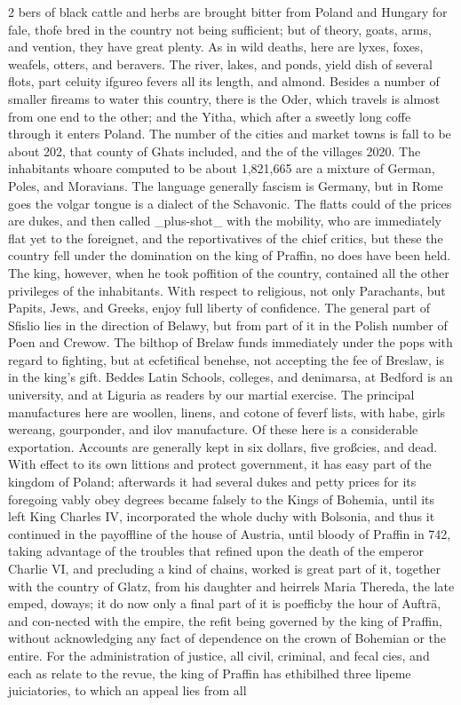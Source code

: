 \documentclass[10pt]{article}
\begin{document}
\begin{multicols}{2}\raggedcolumns
bers of black cattle and herbs are brought bitter from Poland and Hungary for fale, thofe bred in the country not being sufficient; but of theory, goats, arms, and vention, they have great plenty. As in wild deaths, here are lyxes, foxes, weafels, otters, and beravers. The river, lakes, and ponds, yield dish of several flots, part celuity ifgureo fevers all its length, and almond. Besides a number of smaller fireams to water this country, there is the Oder, which travels is almost from one end to the other; and the Yitha, which after a sweetly long coffe through it enters Poland. The number of the cities and market towns is fall to be about 202, that county of Ghats included, and the of the villages 2020. The inhabitants whoare computed to be about 1,821,665 are a mixture of German, Poles, and Moravians. The language generally fascism is Germany, but in Rome goes the volgar tongue is a dialect of the Schavonic. The flatts could of the prices are dukes, and then called \_plus-shot\_ with the mobility, who are immediately flat yet to the foreignet, and the reportivatives of the chief critics, but these the country fell under the domination on the king of Praffin, no does have been held. The king, however, when he took poffition of the country, contained all the other privileges of the inhabitants. With respect to religious, not only Parachants, but Papits, Jews, and Greeks, enjoy full liberty of confidence. The general part of Sfislio lies in the direction of Belawy, but from part of it in the Polish number of Poen and Crewow. The bilthop of Brelaw funds immediately under the pops with regard to fighting, but at ecfetifical benehse, not accepting the fee of Breslaw, is in the king’s gift. Beddes Latin Schools, colleges, and denimarsa, at Bedford is an university, and at Liguria as readers by our martial exercise. The principal manufactures here are woollen, linens, and cotone of feverf lists, with habe, girls wereang, gourponder, and ilov manufacture. Of these here is a considerable exportation. Accounts are generally kept in six dollars, five großcies, and dead. With effect to its own littions and protect government, it has easy part of the kingdom of Poland; afterwards it had several dukes and petty prices for its foregoing vably obey degrees became falsely to the Kings of Bohemia, until its left King Charles IV, incorporated the whole duchy with Bolsonia, and thus it continued in the payoffline of the house of Austria, until bloody of Praffin in 742, taking advantage of the troubles that refined upon the death of the emperor Charlie VI, and precluding a kind of chains, worked is great part of it, together with the country of Glatz, from his daughter and heirrels Maria Thereda, the late emped, doways; it do now only a final part of it is poefficby the hour of Aufträ, and con-nected with the empire, the refit being governed by the king of Praffin, without acknowledging any fact of dependence on the crown of Bohemian or the entire. For the administration of justice, all civil, criminal, and fecal cies, and each as relate to the revue, the king of Praffin has ethibilhed three lipeme juiciatories, to which an appeal lies from all 
\end{multicols}
\end{document}
